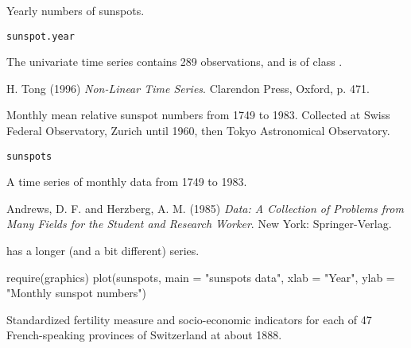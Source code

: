 %
\begin{Description}\relax
Yearly numbers of sunspots. 
\end{Description}
%
\begin{Usage}
\begin{verbatim}
sunspot.year
\end{verbatim}
\end{Usage}
%
\begin{Format}
The univariate time series  contains 289
observations, and is of class .
\end{Format}
%
\begin{Source}\relax
H. Tong (1996)
\emph{Non-Linear Time Series}. Clarendon Press, Oxford, p. 471. 
\end{Source}
%
\begin{Description}\relax
Monthly mean relative sunspot numbers from 1749 to 1983.  Collected at
Swiss Federal Observatory, Zurich until 1960, then Tokyo Astronomical
Observatory.
\end{Description}
%
\begin{Usage}
\begin{verbatim}
sunspots
\end{verbatim}
\end{Usage}
%
\begin{Format}
A time series of monthly data from 1749 to 1983.
\end{Format}
%
\begin{Source}\relax
Andrews, D. F. and Herzberg, A. M. (1985)
\emph{Data: A Collection of Problems from Many Fields for the
Student and Research Worker}.
New York: Springer-Verlag.
\end{Source}
%
\begin{SeeAlso}\relax
{} has a longer (and a bit different) series.
\end{SeeAlso}
%
\begin{Examples}
\begin{ExampleCode}
require(graphics)
plot(sunspots, main = "sunspots data", xlab = "Year",
     ylab = "Monthly sunspot numbers")
\end{ExampleCode}
\end{Examples}
%
\begin{Description}\relax
Standardized fertility measure and socio-economic indicators for each
of 47 French-speaking provinces of Switzerland at about 1888.
\end{Description}
